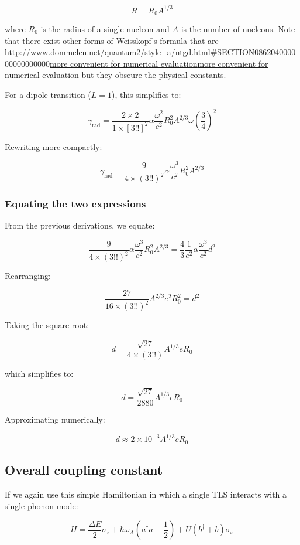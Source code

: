 \documentclass[
]{article}
\let\oldhref\href
\renewcommand{\href}[2]{\ifx#1\urlprefix\oldhref{#1}{#2}\else\uline{\oldhref{#1}{#2}}\fi}
\renewcommand{\[}{\begin{equation}}
\renewcommand{\]}{\end{equation}}
\begin{document}
\[
R = R_0 A^{1/3}
\]

where \(R_0\) is the radius of a single nucleon and \(A\) is the number
of nucleons. Note that there exist other forms of Weisskopf's formula
that are
\href{http://www.dommelen.net/quantum2/style_a/ntgd.html\#SECTION086204000000000000000}{more
convenient for numerical evaluation} but they obscure the physical
constants.

For a dipole transition (\(L=1\)), this simplifies to:

\[
\gamma_{\text{rad}} = \frac{2 \times 2}{1 \times [3!!]^2} \alpha \frac{\omega^2}{c^2} R_0^2 A^{2/3} \omega \left(\frac{3}{4} \right)^2
\]

Rewriting more compactly:

\[
\gamma_{\text{rad}} = \frac{9}{4\times(3!!)^2} \alpha \frac{\omega^3}{c^2} R_0^2 A^{2/3}
\]

\subsubsection{Equating the two
expressions}\label{equating-the-two-expressions}

From the previous derivations, we equate:

\[
\frac{9}{4\times(3!!)^2} \alpha \frac{\omega^3}{c^2} R_0^2 A^{2/3} = \frac{4}{3} \frac{1}{e^2} \alpha \frac{\omega^3}{c^2} d^2
\]

Rearranging:

\[
\frac{27}{16 \times (3!!)^2} A^{2/3} e^2 R_0^2 = d^2
\]

Taking the square root:

\[
d = \frac{\sqrt{27}}{4 \times (3!!)} A^{1/3} e R_0
\]

which simplifies to:

\[
d = \frac{\sqrt{27}}{2880} A^{1/3} e R_0
\]

Approximating numerically:

\[
d \approx 2 \times 10^{-3} A^{1/3} e R_0 \label{eq:d}
\]

\subsection{Overall coupling
constant}\label{overall-coupling-constant-1}

If we again use this simple Hamiltonian in which a single TLS interacts
with a single phonon mode:

\[
H = \frac{\Delta E}{2} \sigma_z + \hbar\omega_A\left(a^{\dagger}a +\frac{1}{2}\right) + U\left( b^{\dagger} + b \right)\sigma_x
\]
\end{document}
